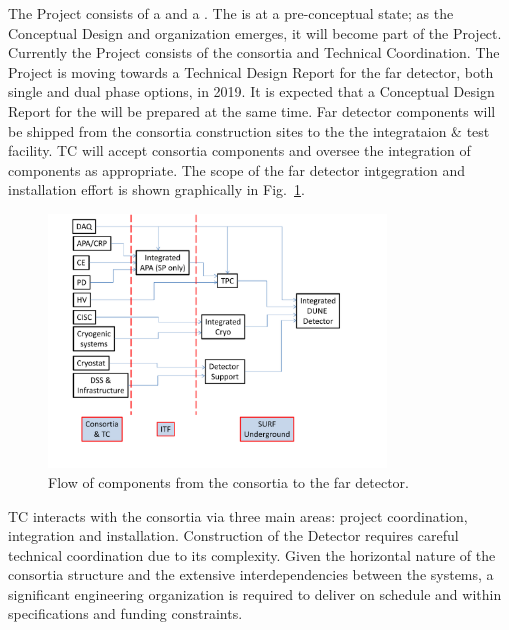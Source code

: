 The  Project consists of a  and a
. The  is at a pre-conceptual state; as the
Conceptual Design and organization emerges, it will become part of the
 Project. Currently the  Project consists of
the   consortia and Technical Coordination.  The
 Project is moving towards a Technical Design Report for
the far detector, both single and dual phase options, in 2019. It is
expected that a Conceptual Design Report for the  will be
prepared at the same time. Far detector components will be shipped
from the consortia construction sites to the the integrataion \& test
facility. TC will accept consortia components and oversee the
integration of components as appropriate. The scope of the
far detector intgegration and installation effort is shown graphically in
Fig.~\ref{fig:TC_flow}.
\begin{figure}[htb]
  \begin{center}
    \includegraphics[width=0.8\textwidth]{far-detector-generic/figures/DUNE_deliverable_flow}
    \caption{Flow of components from the consortia to the far detector.}
    \label{fig:TC_flow}
  \end{center}
\end{figure}

TC interacts with the consortia via three main areas: project
coordination, integration and installation.  Construction of the
 Detector requires careful technical coordination due to
its complexity.  Given the horizontal nature of the consortia
structure and the extensive interdependencies between the systems, a
significant engineering organization is required to deliver
 on schedule and within specifications and funding
constraints.

